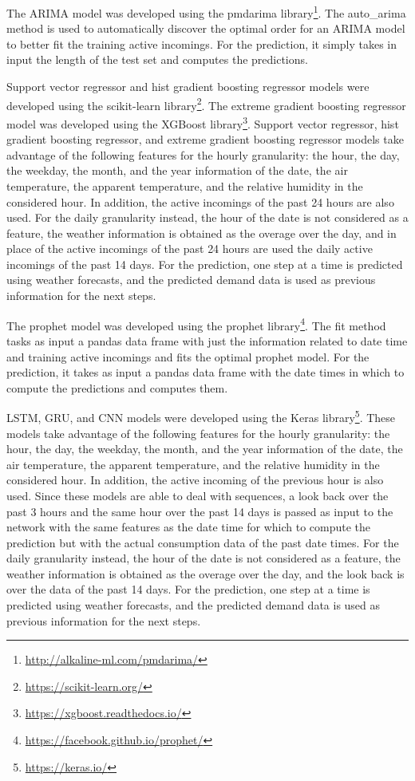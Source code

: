 The ARIMA model was developed using the pmdarima library\footnote{ \url{http://alkaline-ml.com/pmdarima/} }.
The auto\_arima method is used to automatically discover the optimal order for an ARIMA model to better fit the training active incomings.
For the prediction, it simply takes in input the length of the test set and computes the predictions.

Support vector regressor and hist gradient boosting regressor models were developed using the scikit-learn library\footnote{ \url{https://scikit-learn.org/} }.
The extreme gradient boosting regressor model was developed using the XGBoost library\footnote{ \url{https://xgboost.readthedocs.io/} }.
Support vector regressor, hist gradient boosting regressor, and extreme gradient boosting regressor models take advantage of the following features for the hourly granularity: the hour, the day, the weekday, the month, and the year information of the date, the air temperature, the apparent temperature, and the relative humidity in the considered hour.
In addition, the active incomings of the past 24 hours are also used.
For the daily granularity instead, the hour of the date is not considered as a feature, the weather information is obtained as the overage over the day, and in place of the active incomings of the past 24 hours are used the daily active incomings of the past 14 days.
For the prediction, one step at a time is predicted using weather forecasts, and the predicted demand data is used as previous information for the next steps.

The prophet model was developed using the prophet library\footnote{ \url{https://facebook.github.io/prophet/} }.
The fit method tasks as input a pandas data frame with just the information related to date time and training active incomings and fits the optimal prophet model.
For the prediction, it takes as input a pandas data frame with the date times in which to compute the predictions and computes them.

LSTM, GRU, and CNN models were developed using the Keras library\footnote{ \url{https://keras.io/} }.
These models take advantage of the following features for the hourly granularity: the hour, the day, the weekday, the month, and the year information of the date, the air temperature, the apparent temperature, and the relative humidity in the considered hour.
In addition, the active incoming of the previous hour is also used.
Since these models are able to deal with sequences, a look back over the past 3 hours and the same hour over the past 14 days is passed as input to the network with the same features as the date time for which to compute the prediction but with the actual consumption data of the past date times.
For the daily granularity instead, the hour of the date is not considered as a feature, the weather information is obtained as the overage over the day, and the look back is over the data of the past 14 days.
For the prediction, one step at a time is predicted using weather forecasts, and the predicted demand data is used as previous information for the next steps.


